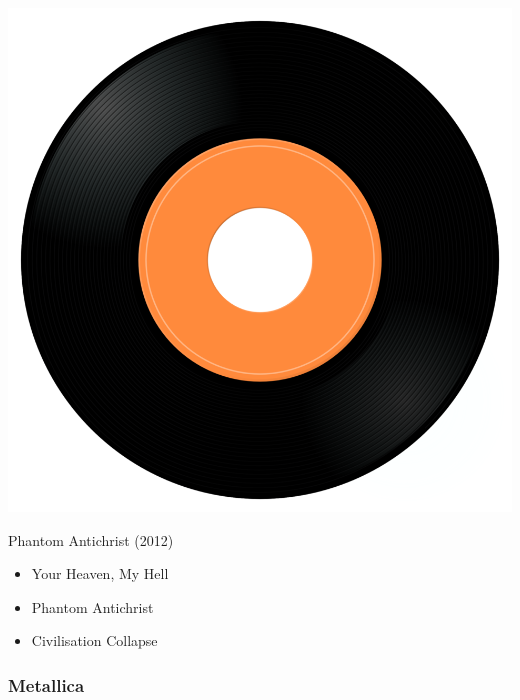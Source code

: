 \begin{minipage}[t]{0.25\textwidth}
\captionsetup{type=figure}
\includegraphics[width=\textwidth]{Images/cover.png}
\caption*{Phantom Antichrist (2012)}
\end{minipage}
\begin{minipage}[t]{0.25\textwidth}\vspace{0pt}
\begin{itemize}[nosep,leftmargin=1em,labelwidth=*,align=left]
	\setlength{\itemsep}{0pt}
	\item Your Heaven, My Hell
	\item Phantom Antichrist
	\item Civilisation Collapse
\end{itemize}
\end{minipage}

\subsubsection{Metallica}

